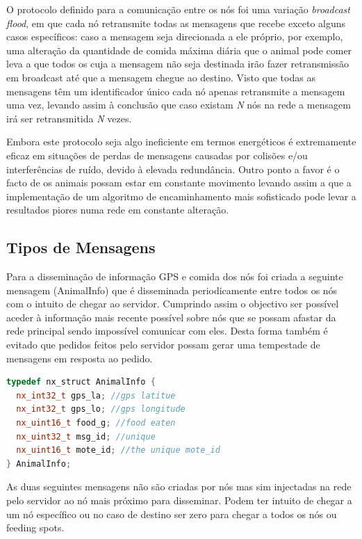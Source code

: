 \documentclass[times,10pt,twocolumn]{article}
\begin{document}
O protocolo definido para a comunicação entre os nós foi uma variação \emph{broadcast flood}, em que cada nó retransmite todas as mensagens que recebe exceto alguns casos específicos: caso a mensagem seja direcionada a ele próprio, por exemplo, uma alteração da quantidade de comida máxima diária que o animal pode comer leva a que todos os cuja a mensagem não seja destinada irão fazer retransmissão em broadcast até que a mensagem chegue ao destino. Visto que todas as mensagens têm um identificador único cada nó apenas retransmite a mensagem uma vez, levando assim à conclusão que caso existam \emph{N} nós na rede a mensagem irá ser retransmitida \emph{N} vezes.

Embora este protocolo seja algo ineficiente em termos energéticos é extremamente eficaz em situações de perdas de mensagens causadas por colisões e/ou interferências de ruído, devido à elevada redundância. Outro ponto a favor é o facto de os animais possam estar em constante movimento levando assim a que a implementação de um algoritmo de encaminhamento mais sofisticado pode levar a resultados piores numa rede em constante alteração.

\subsection{Tipos de Mensagens}

Para a disseminação de informação GPS e comida dos nós foi criada a seguinte mensagem (AnimalInfo) que é disseminada periodicamente entre todos os nós com o intuito de chegar ao servidor. Cumprindo assim o objectivo ser possível aceder à informação mais recente possível sobre nós que se possam afastar da rede principal sendo impossível comunicar com eles. Desta forma também é evitado que pedidos feitos pelo servidor possam gerar uma tempestade de mensagens em resposta ao pedido.

\begin{lstlisting}[language=c++]
typedef nx_struct AnimalInfo {
  nx_int32_t gps_la; //gps latitue
  nx_int32_t gps_lo; //gps longitude
  nx_uint16_t food_g; //food eaten
  nx_uint32_t msg_id; //unique
  nx_uint16_t mote_id; //the unique mote_id
} AnimalInfo;
\end{lstlisting}

As duas seguintes mensagens não são criadas por nós mas sim injectadas na rede pelo servidor ao nó mais próximo para disseminar. Podem ter intuito de chegar a um nó específico ou no caso de destino ser zero para chegar a todos os nós ou feeding spots.
\end{document}

